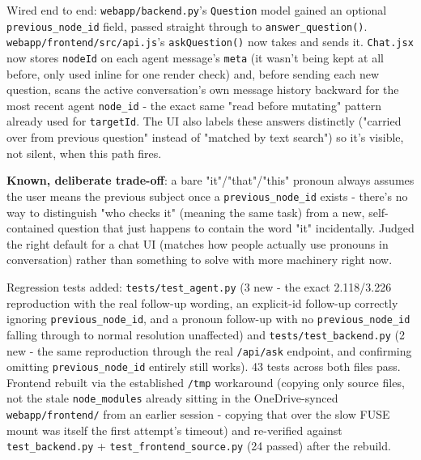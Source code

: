 Wired end to end: \texttt{webapp/\allowbreak{}backend.py}'s \texttt{Question} model gained an optional \texttt{previous\_\allowbreak{}node\_\allowbreak{}id} field, passed straight through to \texttt{answer\_\allowbreak{}question()}. \texttt{webapp/\allowbreak{}frontend/\allowbreak{}src/\allowbreak{}api.js}'s \texttt{askQuestion()} now takes and sends it. \texttt{Chat.jsx} now stores \texttt{nodeId} on each agent message's \texttt{meta} (it wasn't being kept at all before, only used inline for one render check) and, before sending each new question, scans the active conversation's own message history backward for the most recent agent \texttt{node\_\allowbreak{}id} - the exact same "read before mutating" pattern already used for \texttt{targetId}. The UI also labels these answers distinctly ("carried over from previous question" instead of "matched by text search") so it's visible, not silent, when this path fires.

\textbf{Known, deliberate trade-off}: a bare "it"/"that"/"this" pronoun always assumes the user means the previous subject once a \texttt{previous\_\allowbreak{}node\_\allowbreak{}id} exists - there's no way to distinguish "who checks it" (meaning the same task) from a new, self-contained question that just happens to contain the word "it" incidentally. Judged the right default for a chat UI (matches how people actually use pronouns in conversation) rather than something to solve with more machinery right now.

Regression tests added: \texttt{tests/\allowbreak{}test\_\allowbreak{}agent.py} (3 new - the exact 2.118/3.226 reproduction with the real follow-up wording, an explicit-id follow-up correctly ignoring \texttt{previous\_\allowbreak{}node\_\allowbreak{}id}, and a pronoun follow-up with no \texttt{previous\_\allowbreak{}node\_\allowbreak{}id} falling through to normal resolution unaffected) and \texttt{tests/\allowbreak{}test\_\allowbreak{}backend.py} (2 new - the same reproduction through the real \texttt{/\allowbreak{}api/\allowbreak{}ask} endpoint, and confirming omitting \texttt{previous\_\allowbreak{}node\_\allowbreak{}id} entirely still works). 43 tests across both files pass. Frontend rebuilt via the established \texttt{/\allowbreak{}tmp} workaround (copying only source files, not the stale \texttt{node\_\allowbreak{}modules} already sitting in the OneDrive-synced \texttt{webapp/\allowbreak{}frontend/\allowbreak{}} from an earlier session - copying that over the slow FUSE mount was itself the first attempt's timeout) and re-verified against \texttt{test\_\allowbreak{}backend.py} + \texttt{test\_\allowbreak{}frontend\_\allowbreak{}source.py} (24 passed) after the rebuild.

